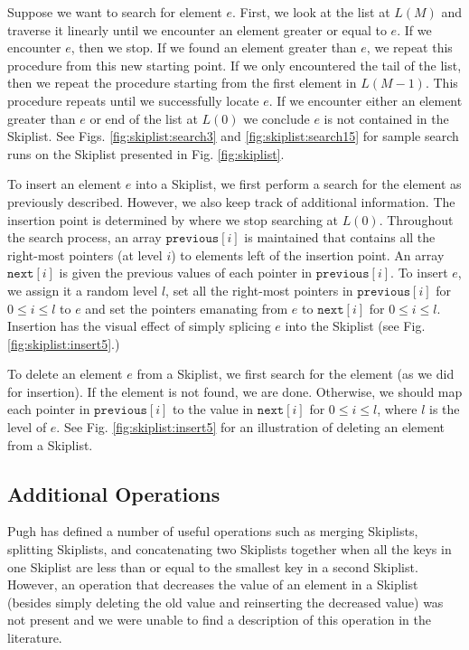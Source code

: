 \documentclass{acm_proc_article-sp}
\begin{document}
Suppose we want to search for element $e$. First,
we look at the list at $L(M)$ and traverse it linearly until we encounter
an element greater or equal to $e$.  If we encounter $e$, then we stop.
If we found an element greater than $e$, we repeat this procedure from
this new starting point. If we only encountered the tail of the list, then we
repeat the procedure starting from the first element in $L(M-1)$. This procedure
repeats until we successfully locate $e$. If we encounter either an element
greater than $e$ or end of the list at $L(0)$ we conclude $e$ is
not contained in the Skiplist. See Figs. \ref{fig:skiplist:search3} and \ref{fig:skiplist:search15}
for sample search runs on the Skiplist presented in Fig. \ref{fig:skiplist}.

To insert an element $e$ into a Skiplist, we first perform a search for the element
as previously described. However, we also keep track of additional information.
The insertion point is determined by where we stop searching at $L(0)$. Throughout the
search process, an array
$\texttt{previous}[i]$ is maintained that contains all the right-most pointers (at level $i$)
to elements left of the insertion point. An array $\texttt{next}[i]$ is given the previous values
of each pointer in $\texttt{previous}[i]$. To insert $e$, we assign it a random level $l$, set 
all the right-most pointers in $\texttt{previous}[i]$ for $0 \leq i \leq l$ to $e$ and set
the pointers emanating from $e$ to $\texttt{next}[i]$ for $0 \leq i \leq l$. Insertion has
the visual effect of simply splicing $e$ into the Skiplist (see Fig. \ref{fig:skiplist:insert5}.)

To delete an element $e$ from a Skiplist, we first search for the element (as we did for insertion).
If the element is not found, we are done. Otherwise, we should map each pointer in $\texttt{previous}[i]$
to the value in $\texttt{next}[i]$ for $0 \leq i \leq l$, where $l$ is the level of $e$. See Fig. \ref{fig:skiplist:insert5} for an illustration of deleting an element from a Skiplist.

\subsection{Additional Operations}
Pugh has defined \cite{pugh90a} a number of useful
operations such as merging Skiplists, splitting Skiplists, and
concatenating two Skiplists together when all the keys in one Skiplist
are less than or equal to the smallest key in a second Skiplist. However,
an operation that decreases the value of an element in a Skiplist (besides
simply deleting the old value and reinserting the decreased value) was not present and
we were unable to find a description of this operation in the literature.
\end{document}
